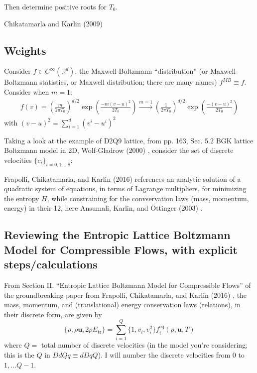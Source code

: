 \documentclass[twoside,landscape,10pt]{amsart}
\theoremstyle{plain}
\theoremstyle{definition}
\theoremstyle{remark}
\theoremstyle{remark}
\begin{document}
\begin{multicols*}{2}
Then determine positive roots for $T_0$.  



Chikatamarla and Karlin (2009) \cite{ChKa2009}

\subsection{Weights}

Consider $f\in C^{\infty}(\mathbb{R}^d)$, the Maxwell-Boltzmann ``distribution'' (or Maxwell-Boltzmann statistics, or Maxwell distribution; there are many names) $f^{MB}\equiv f$.  Consider when $m=1$:
\begin{equation}
\begin{gathered}
  f(v) = \left( \frac{m}{2\pi T_0} \right)^{d/2} \exp{ \left( \frac{ -m(v-u)^2 }{ 2T_0} \right) } \xrightarrow{ m=1} \left( \frac{1}{ 2\pi T_0} \right)^{d/2} \exp{ \left( \frac{ -(v-u)^2}{ 2T_0 } \right)} 
  \end{gathered}
\end{equation}
with $(v-u)^2 = \sum_{i=1}^d (v^i-u^i)^2$


Taking a look at the example of D2Q9 lattice, from pp. 163, Sec. 5.2 BGK lattice Boltzmann model in 2D, Wolf-Gladrow (2000) \cite{DWol2000}, consider the set of discrete velocities $\lbrace c_i \rbrace_{i=0,1,\dots 8}$:





Frapolli, Chikatamarla, and Karlin (2016) \cite{FCK2016} references an analytic solution of a quadratic system of equations, in terms of Lagrange multipliers, for minimizing the entropy $H$, while constraining for the convservation laws (mass, momentum, energy) in their 12, here Ansumali, Karlin, and \"{O}ttinger (2003) \cite{AKO2003}.


\subsection{Reviewing the Entropic Lattice Boltzmann Model for Compressible Flows, with explicit steps/calculations}

From Section II. ``Entropic Lattice Boltzmann Model for Compressible Flows'' of the groundbreaking paper from Frapolli, Chikatamarla, and Karlin (2016) \cite{FCK2016}, the mass, momentum, and (translational) energy conservation laws (relations), in their discrete form, are given by
\begin{equation}
  \lbrace \rho, \rho\mathbf{u}, 2\rho E_{\text{tr}} \rbrace = \sum_{i=1}^Q \lbrace 1, v_i, v_i^2 \rbrace f_i^{\text{eq}}(\rho, \mathbf{u}, T)
  \end{equation}
where $Q = $ total number of discrete velocities (in the model you're considering; this is the $Q$ in $DdQq\equiv dDqQ$).  I will number the discrete velocities from $0$ to $1,\dots Q-1$.  


\end{multicols*}
\end{document}
